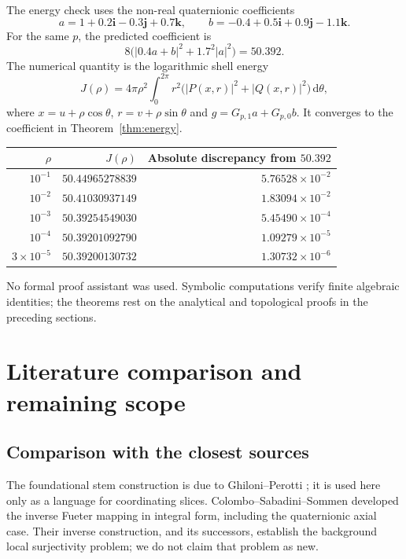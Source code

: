 \documentclass[11pt,a4paper]{article}
\numberwithin{equation}{section}
\theoremstyle{definition}
\theoremstyle{remark}
\newcommand{\ii}{\mathbf i}
\newcommand{\jj}{\mathbf j}
\newcommand{\kk}{\mathbf k}
\newcommand{\dd}{\,\mathrm d}
\begin{document}
The energy check uses the non-real quaternionic coefficients
\[
 a=1+0.2\ii-0.3\jj+0.7\kk,
 \qquad b=-0.4+0.5\ii+0.9\jj-1.1\kk.
\]
For the same $p$, the predicted coefficient is
\[
 8\bigl(|0.4a+b|^2+1.7^2|a|^2\bigr)=50.392.
\]
The numerical quantity is the logarithmic shell energy
\begin{equation}
 J(\rho)=4\pi\rho^2\int_0^{2\pi}r^2
      \bigl(|P(x,r)|^2+|Q(x,r)|^2\bigr)\dd\theta,
 \label{eq:numerical-energy}
\end{equation}
where $x=u+\rho\cos\theta$, $r=v+\rho\sin\theta$ and
$g=G_{p,1}a+G_{p,0}b$. It converges to the coefficient in
Theorem~\ref{thm:energy}.
\begin{center}
\begin{tabular}{@{}rrr@{}}
\toprule
$\rho$ & $J(\rho)$ & Absolute discrepancy from $50.392$\\
\midrule
$10^{-1}$ & $50.44965278839$ & $5.76528\times10^{-2}$\\
$10^{-2}$ & $50.41030937149$ & $1.83094\times10^{-2}$\\
$10^{-3}$ & $50.39254549030$ & $5.45490\times10^{-4}$\\
$10^{-4}$ & $50.39201092790$ & $1.09279\times10^{-5}$\\
$3\times10^{-5}$ & $50.39200130732$ & $1.30732\times10^{-6}$\\
\bottomrule
\end{tabular}
\end{center}
No formal proof assistant was used. Symbolic computations verify finite
algebraic identities; the theorems rest on the analytical and topological
proofs in the preceding sections.

\section{Literature comparison and remaining scope}
\label{sec:literature}

\subsection{Comparison with the closest sources}
The foundational stem construction is due to Ghiloni--Perotti
\cite{GP}; it is used here only as a language for coordinating slices.
Colombo--Sabadini--Sommen \cite{CSS} developed the inverse Fueter mapping
in integral form, including the quaternionic axial case. Their inverse
construction, and its successors, establish the background local
surjectivity problem; we do not claim that problem as new.
\end{document}

